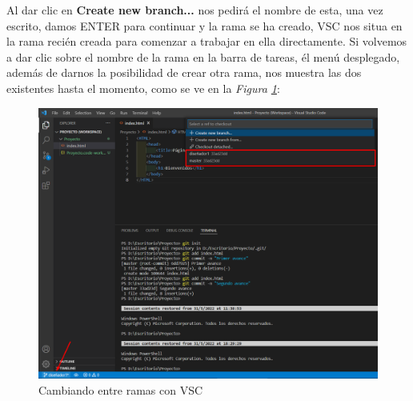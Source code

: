 \begin{enumerate}
    Al dar clic en \textbf{Create new branch...} nos pedirá el nombre de esta, una vez escrito, damos ENTER para continuar y la rama se ha creado, VSC nos situa en la rama recién creada para comenzar a trabajar en ella directamente. Si volvemos a dar clic sobre el nombre de la rama en la barra de tareas, él menú desplegado, además de darnos la posibilidad de crear otra rama, nos muestra las dos existentes hasta el momento, como se ve en la \textit{Figura \ref{fig: 18}}:
    \begin{figure}[H]
        \centering
        \caption{Cambiando entre ramas con VSC}
        \label{fig: 18}
        \includegraphics[width=\textwidth]{capturas/abriendo_b1.png}
    \end{figure}
    

\end{enumerate}
